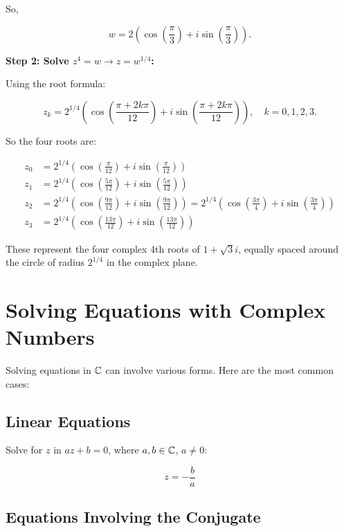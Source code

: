 So,

\[
	w = 2 \left( \cos\left( \frac{\pi}{3} \right) + i \sin\left( \frac{\pi}{3} \right) \right).
\]

\textbf{Step 2: Solve \( z^4 = w \to z = w^{1/4} \):}

Using the root formula:

\[
	z_k = 2^{1/4} \left( \cos\left( \frac{\pi + 2k\pi}{12} \right) + i \sin\left( \frac{\pi + 2k\pi}{12} 
	\right) \right), \quad k = 0, 1, 2, 3.
\]

So the four roots are:

\begin{align*}
	z_0 & = 2^{1/4} \left( \cos\left( \frac{\pi}{12} \right) + i \sin\left( \frac{\pi}{12} \right) \right)                                                                                                    \\
	z_1 & = 2^{1/4} \left( \cos\left( \frac{5\pi}{12} \right) + i \sin\left( \frac{5\pi}{12} \right) \right)                                                                                                  \\
	z_2 & = 2^{1/4} \left( \cos\left( \frac{9\pi}{12} \right) + i \sin\left( \frac{9\pi}{12} \right) \right) = 2^{1/4} \left( \cos\left( \frac{3\pi}{4} \right) + i \sin\left( \frac{3\pi}{4} \right) \right) \\
	z_3 & = 2^{1/4} \left( \cos\left( \frac{13\pi}{12} \right) + i \sin\left( \frac{13\pi}{12} \right) \right)
\end{align*}

These represent the four complex 4th roots of \( 1 + \sqrt{3}i \), equally spaced around the circle of 
radius \( 2^{1/4} \) in the complex plane.

\section{Solving Equations with Complex Numbers}

Solving equations in \( \mathbb{C} \) can involve various forms. Here are the most common cases:

\subsection{Linear Equations}

Solve for \(z\) in \( az + b = 0 \), where \( a, b \in \mathbb{C} \), \( a \neq 0 \):
	
\[
	z = -\frac{b}{a}
\]

\subsection{Equations Involving the Conjugate}

